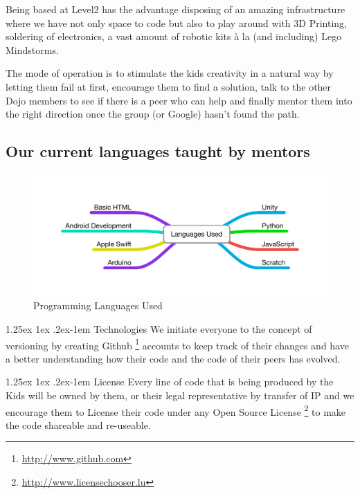 \documentclass{proposal}
\makeatletter
\renewcommand{\paragraph}{
  \@startsection{paragraph}{4}
    {\z@}{1.25ex \@plus 1ex \@minus .2ex}{-1em}
      {\normalfont\normalsize\bfseries}
      }
\makeatother
\begin{document}
Being based at Level2 has the advantage disposing of an amazing infrastructure where we have not only space to code but also to play around with 3D Printing, soldering of electronics, a vast amount of robotic kits à la (and including) Lego Mindstorms.

The mode of operation is to stimulate the kids creativity in a natural way by letting them fail at first, encourage them to find a solution, talk to the other Dojo members to see if there is a peer who can help and finally mentor them into the right direction once the group (or Google) hasn't found the path.

\subsection*{Our current languages taught by mentors}

\begin{figure}[h]
        \centering
                \centering
	  \includegraphics[scale=0.7]{images/LanguagesUsed}
                \caption{Programming Languages Used}
                \label{fig:gull}
\end{figure}

\newpage

\paragraph{Technologies}
We initiate everyone to the concept of versioning by creating Github \footnote{\url{http://www.github.com}} accounts to keep track of their changes and have a better understanding how their code and the code of their peers has evolved.

\paragraph{License}
Every line of code that is being produced by the Kids will be owned by them, or their legal representative by transfer of IP and we encourage them to License their code under any Open Source License \footnote{\url{http://www.licensechooser.lu}} to make the code shareable and re-useable.
\end{document}
